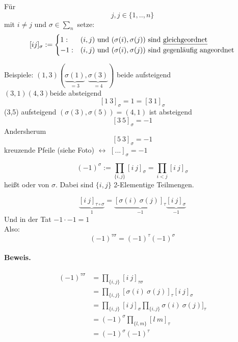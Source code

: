 \documentclass[9pt]{article} %
\begin{document}
Für 
\[j,j \in \{1,..,n\}\]
mit $i \neq j$ und $\sigma \in \sum_n$ setze: 
\[[ij]_{\sigma} := \begin{cases}
     1: & (i,j) \text{ und } (\sigma(i), \sigma(j)) \text{ sind \beg{gleichgeordnet}}  \\ 
      -1: & (i,j) \text{ und }  (\sigma(i), \sigma(j))  \text{ sind gegenläufig angeordnet}
    \end{cases}\]
      
    
    \noindent Beispiele: 
    $(1,3) (\underbrace{\sigma(1)}_{=3}, \underbrace{\sigma(3)}_{=4})$ beide aufsteigend \\
    $(3,1) (4,3)$beide absteigend  
    \[[1\ 3]_{\sigma} = 1 = [3\  1]_{\sigma}\]
    (3,5) aufsteigend $(\sigma(3), \sigma(5))=(4,1)$ ist absteigend 
    \[[3\ 5]_{\sigma} = -1\] 
    Andersherum 
    \[[5\ 3]_{\sigma} = -1\]
    kreuzende Pfeile (siehe Foto) $\leftrightarrow$ $[...]_{\sigma} = -1$
    \begin{defi}
    
    \[ (-1)^{\sigma} := \prod_{\{i,j\}} [i\ j]_{\sigma} = \prod_{i < j}  [i\ j]_{\sigma} \] 
    heißt  oder  von $\sigma$.  
    Dabei sind $\{i,j\}$ 2-Elementige Teilmengen. 
    \end{defi}
    \begin{beob}
    \[
    \underbrace{[i\ j]_{\tau \circ \sigma} }_1= \underbrace{[\sigma(i) \ \sigma(j)]_{\tau}}_{-1} \underbrace{[i\ j]_{\sigma}}_{-1}
    \]
    Und in der Tat $-1 \cdot -1 = 1$ \\
     Also: 
    \[(-1)^{\tau \sigma} = (-1)^{\tau } (-1)^{\sigma }\]
    \paragraph{Beweis.}    
    \begin{align*}
        (-1)^{\tau \sigma} & = \prod_{\{i,j\}} [i\ j]_{\tau \sigma}  \\
        & = \prod_{\{i,j\}} [\sigma(i) \ \sigma(j)]_{\tau} [i\ j]_{\sigma} \\
        & = \prod_{\{i,j\}}  [i\ j]_{\sigma}  \prod_{\{i,j\}} \sigma(i) \ \sigma(j)]_{\tau} \\
        & = (-1)^{\sigma}  \prod_{\{l, m\}} [l\ m]_{\tau} \\
        & = (-1)^{\sigma} (-1)^{\tau} 
    \end{align*} \bluenote{}
    \end{beob}
\end{document}
